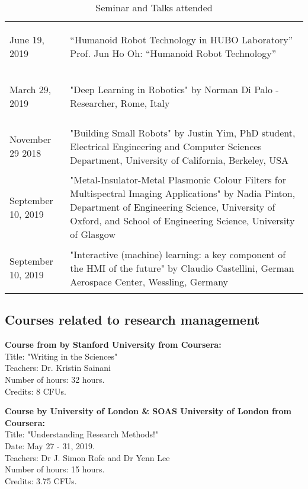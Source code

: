 \begin{table}[ht]
{\begin{tabular}{p{2.5cm} p{14cm}}
       \rowcolor{lightgray} \begin{center}
           June 19, 2019
       \end{center} &“Humanoid Robot Technology in HUBO Laboratory” Prof. Jun Ho Oh: “Humanoid Robot Technology”\\
        \begin{center}
            March 29, 2019
        \end{center}& "Deep Learning in Robotics" by Norman Di Palo - Researcher, Rome, Italy \\
        
        \rowcolor{lightgray} \begin{center}
            November 29 2018
        \end{center} & "Building Small Robots" by Justin Yim, PhD student, Electrical Engineering and Computer Sciences Department, University of California, Berkeley, USA \\
        \begin{center}
            September 10, 2019 
        \end{center} & "Metal-Insulator-Metal Plasmonic Colour Filters for Multispectral Imaging Applications" by Nadia Pinton, Department of Engineering Science, University of Oxford, and School of Engineering Science, University of Glasgow\\
        
        \rowcolor{lightgray} \begin{center}
              September 10, 2019
        \end{center} & "Interactive (machine) learning: a key component of the HMI of the future" by Claudio Castellini, German Aerospace Center, Wessling, Germany\\
 \end{tabular}}
 \caption{Seminar and Talks attended}
 \label{table:Seminar}
\end{table}

\subsection{Courses related to research management}

\textbf{Course from by Stanford University from Coursera: }\\
Title: "Writing in the Sciences"\\
Teachers: Dr. Kristin Sainani \\
Number of hours: 32 hours.\\ 
Credits: 8 CFUs.

\textbf{Course by University of London & SOAS University of London from Coursera:}\\
Title: "Understanding Research Methods!"\\
Date:  May 27 - 31, 2019.\\
Teachers:  Dr J. Simon Rofe and  Dr Yenn Lee \\
Number of hours: 15 hours.\\ 
Credits: 3.75 CFUs.
